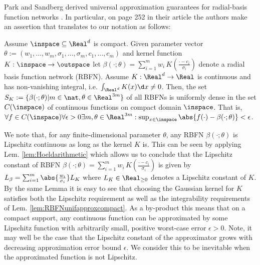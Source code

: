 Park and Sandberg derived universal approximation guarantees for radial-basis function networks \cite{Park1991}. In particular, on page 252 in their article the authors make an assertion that translates to our notation as follows: 

\begin{lem} \label{lem:RBFNunifapproxcompact} Assume $\inspace \subseteq \Real^d$ is compact. Given parameter  vector $\theta := (w_1,\ldots,w_m,\sigma_1,...,\sigma_m,c_1,\ldots, c_m)$ and kernel function $K: \inspace \to \outspace $ let $\beta(\cdot;\theta ) = \sum_{i=1}^m w_i \, K(\frac{\cdot - c_i}{\sigma_i} )  $ denote a radial basis function network (RBFN). Assume $K: \Real^d \to \Real$ is continuous and has non-vanishing integral, i.e. $\int_{\Real^d} K(x) \d x \neq 0$.
Then, the set $S_K:= \{ \beta(\cdot; \theta) \vert  m \in \nat, \theta \in \Real^{3m}  \}$ of all RBFNs is uniformly dense in the set $C(\inspace)$ of continuous functions on compact domain $\inspace$. That is,  $\forall f \in C(\inspace) \forall \epsilon >0  \exists m, \theta \in \Real^{3m} : \sup_{x \in \inspace}{ \abs{f(\cdot) -\beta(\cdot;\theta)  } } <\epsilon $. 
\end{lem}

\begin{remark} \label{rem:LipconstofRBFN}
We note that, for any finite-dimensional parameter $\theta$, any RBFN $\beta(\cdot;\theta)$ is Lipschitz continuous as long as the kernel $K$ is. This can be seen by applying Lem. \ref{lem:Hoeldarithmetic} which allows us to conclude that the Lipschitz constant of RBFN $\beta(\cdot;\theta ) = \sum_{i=1}^m w_i \, K(\frac{\cdot - c_i}{\sigma_i} ) $ is given by $L_\beta = \sum_{i=1}^m \abs{\frac{w_i}{\sigma_i}} L_{K}$ where $L_K \in \Real_{\geq 0}$ denotes a Lipschitz constant of $K$. By the same Lemma it is easy to see that choosing the Gaussian kernel for $K$ satisfies both the Lipschitz requirement as well as the integrability requirements of Lem. \ref{lem:RBFNunifapproxcompact}. As a by-product this means that on a compact support, any continuous function can be approximated by some Lipschitz function with arbitrarily small, positive worst-case error $\epsilon >0$. Note, it may well be the case that the Lipschitz constant of the approximator grows with decreasing approximation error bound $\epsilon$. We consider this to be inevitable when the approximated function is not Lipschitz.
\end{remark}

